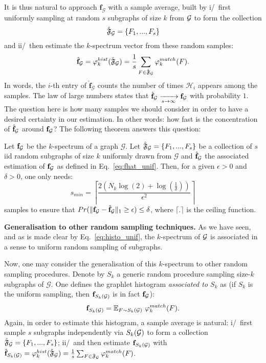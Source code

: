 It is thus natural to approach $\mathbf{f}_\mathcal{G}$ with a sample average, built by i/~first uniformly sampling at random $s$ subgraphs of size $k$ from $\mathcal{G}$ to form the collection 
$$\hat{\mathfrak{F}}_{\mathcal{G}}=\{F_1,...,F_s\}$$
and ii/~then estimate the $k$-spectrum vector from these random samples:
\begin{align}
	\label{eq:fhat_unif}
	\hat{\mathbf{f}}_\mathcal{G} = \varphi_k^{hist}(\hat{\mathfrak{F}}_{\mathcal{G}})= \frac{1}{s}\sum_{F\in\hat{\mathfrak{F}}_{\mathcal{G}}} \varphi^{match}_k(F).
\end{align}
In words, the $i$-th entry of $\hat{\mathbf{f}}_\mathcal{G}$ counts the number of times $\mathcal{H}_i$ appears among the samples. 
The law of large numbers states that $\hat{\mathbf{f}}_{\mathcal{G}} \xrightarrow[s \to \infty]{} \mathbf{f}_\mathcal{G}$ with probability $1$.
The question here is how many samples we should consider in order to have a desired certainty in our estimation. In other words: how fast is the concentration of $\hat{\mathbf{f}}_{\mathcal{G}}$ around $\mathbf{f}_{\mathcal{G}}$? The following theorem answers this question:%
\begin{theorem}
	\label{thm:norm1}
	Let $\mathbf{f}_{\mathcal{G}}$ be the $k$-spectrum of a graph $\mathcal{G}$. Let $\hat{\mathfrak{F}}_{\mathcal{G}}=\{F_1,...,F_{s}\}$ be a collection of $s$ iid random subgraphs of size $k$ uniformly drawn from $\mathcal{G}$ and $\hat{\mathbf{f}}_{\mathcal{G}}$ the associated estimation of $\mathbf{f}_{\mathcal{G}}$ as defined in Eq.~\eqref{eq:fhat_unif}. Then, for a given $\epsilon>0$ and $\delta >0$, one only needs:
	\begin{equation}
	s_{min}=\left \lceil \frac{2(N_k\log(2)+\log(\frac{1}{\delta} ))}{\epsilon^2} \right \rceil
	\end{equation}
	samples to ensure that $Pr(\| \mathbf{f}_{\mathcal{G}}-\hat{\mathbf{f}}_\mathcal{G} \|_1 \geq \epsilon )\leq\delta$, where $\lceil.\rceil$ is the ceiling function.
\end{theorem}

\noindent\textbf{Generalisation to other random sampling techniques.} As we have seen, and as is made clear by Eq.~\eqref{eq:histo_unif}, the $k$-spectrum of $\mathcal{G}$ is associated in a sense to uniform random sampling of subgraphs. 

Now, one may consider the generalisation of this $k$-spectrum to other random sampling procedures. Denote by $S_k$ a generic random procedure sampling size-$k$ subgraphs of $\mathcal{G}$. One defines the graphlet histogram \emph{associated to $S_k$} as (if $S_k$ is the uniform sampling, then $\mathbf{f}_{S_k(\mathcal{G})}$ is in fact $\mathbf{f}_{\mathcal{G}}$):
$$\mathbf{f}_{S_k(\mathcal{G})} = \mathbb{E}_{F \sim S_k(\mathcal{G})}~ \varphi^{match}_k(F).$$
Again, in order to estimate this histogram, a sample average is natural: i/~first sample $s$ subgraphs independently via $S_k(\mathcal{G})$ to form a collection $\hat{\mathfrak{F}}_{\mathcal{G}}=\{F_1,...,F_s\}$;
ii/~and then estimate $\mathbf{f}_{S_k(\mathcal{G})}$ with $\hat{\mathbf{f}}_{S_k(\mathcal{G})} = \varphi_k^{hist}(\hat{\mathfrak{F}}_{\mathcal{G}})= \frac{1}{s}\sum_{F\in\hat{\mathfrak{F}}_{\mathcal{G}}} \varphi^{match}_k(F)$. 

